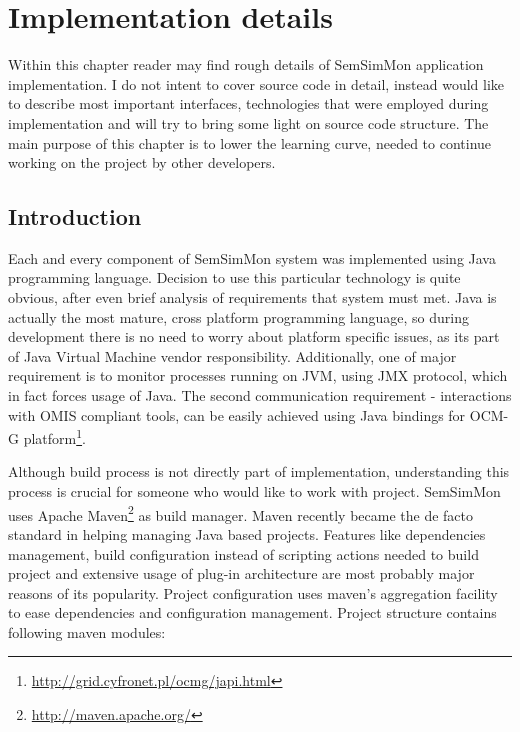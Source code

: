 %
\chapter{Implementation details}
\label{cha:implementation}

\parbox{0.8\textwidth}{

{\small
Within this chapter reader may find rough details of SemSimMon application implementation. I do not intent to cover source code in detail, instead would like to describe most important interfaces, technologies that were employed during implementation and will try to bring some light on source code structure. The main purpose of this chapter is to lower the learning curve, needed to continue working on the project by other developers.

}
}


\section{Introduction}

Each and every component of SemSimMon system was implemented using Java programming language. Decision to use this particular technology is quite obvious, after even brief analysis of requirements that system must met. Java is actually the most mature, cross platform programming language, so during development there is no need to worry about platform specific issues, as its part of Java Virtual Machine vendor responsibility. Additionally, one of major requirement is to monitor processes running on JVM, using JMX protocol, which in fact forces usage of Java. The second communication requirement - interactions with OMIS compliant tools, can be easily achieved using Java bindings for OCM-G platform\footnote{\url{http://grid.cyfronet.pl/ocmg/japi.html}}. 

Although build process is not directly part of implementation, understanding this process is crucial for someone who would like to work with project. SemSimMon uses Apache Maven\footnote{\url{http://maven.apache.org/}} as build manager. Maven recently became the de facto standard in helping managing Java based projects. Features like dependencies management, build configuration instead of scripting actions needed to build project and extensive usage of plug-in architecture are most probably major reasons of its popularity. Project configuration uses maven's aggregation facility to ease dependencies and configuration management. Project structure contains following maven modules:

